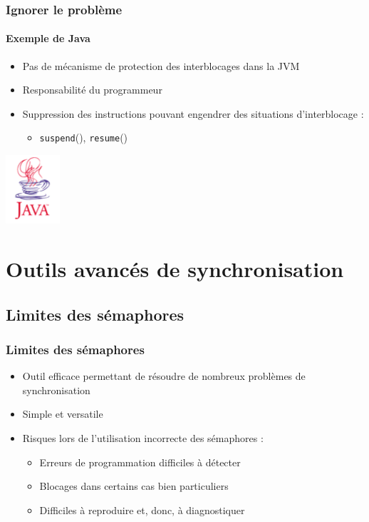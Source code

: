 \begin{frame}
\frametitle{Ignorer le problème}
\framesubtitle{Exemple de Java}
\begin{itemize}
\item Pas de mécanisme de protection des interblocages dans la JVM
\item Responsabilité du programmeur
\item Suppression des instructions pouvant engendrer des situations d’interblocage :
\begin{itemize}
\item \texttt{suspend}(), \texttt{resume}()
\end{itemize}
\end{itemize}
\includegraphics[width=2cm]{../illustration/java.png}
\end{frame}



\section{Outils avancés de synchronisation}

\subsection{Limites des sémaphores}
\begin{frame}
\frametitle{Limites des sémaphores}
\begin{itemize}
\item <1-> Outil efficace permettant de résoudre de nombreux problèmes de synchronisation
\item <1-> Simple et versatile
\item <2-> Risques lors de l’utilisation incorrecte des sémaphores :
\begin{itemize}
\item Erreurs de programmation difficiles à détecter
\item Blocages dans certains cas bien particuliers
\item Difficiles à reproduire et, donc, à diagnostiquer
\end{itemize}
\end{itemize}
\end{frame}

